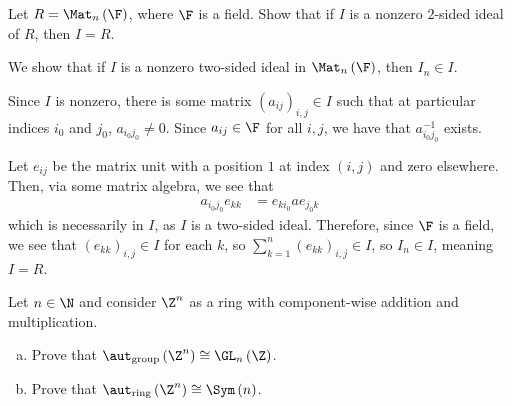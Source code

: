 \documentclass[10pt]{mypackage}
\begin{document}
\begin{problem}[Problem 7]
  Let $R = \Mat_{n}\left( \F \right)$, where $\F$ is a field. Show that if $I$ is a nonzero $2$-sided ideal of $R$, then $I = R$.
\end{problem}
\begin{solution}
  We show that if $I$ is a nonzero two-sided ideal in $\Mat_{n}\left( \F \right)$, then $I_{n}\in I$.\newline

  Since $I$ is nonzero, there is some matrix $\left( a_{ij} \right)_{i,j}\in I$ such that at particular indices $i_0$ and $j_0$, $a_{i_0j_0}\neq 0$. Since $a_{ij}\in \F$ for all $i,j$, we have that $a_{i_0j_0}^{-1}$ exists.\newline

  Let $e_{ij}$ be the matrix unit with a position $1$ at index $\left( i,j \right)$ and zero elsewhere. Then, via some matrix algebra, we see that
  \begin{align*}
    a_{i_0j_0} e_{kk} &= e_{ki_0}a e_{j_0 k}
  \end{align*}
  which is necessarily in $I$, as $I$ is a two-sided ideal. Therefore, since $\F$ is a field, we see that $\left( e_{kk} \right)_{i,j}\in I$ for each $k$, so $\sum_{k=1}^{n}\left( e_{kk} \right)_{i,j}\in I$, so $I_{n}\in I$, meaning $I = R$.
\end{solution}
\begin{problem}[Problem 8]
  Let $n\in\N$ and consider $\Z^{n}$ as a ring with component-wise addition and multiplication.
  \begin{enumerate}[(a)]
    \item Prove that $\aut_{\text{group}}\left( \Z^{n} \right) \cong \GL_{n}\left( \Z \right)$.
    \item Prove that $\aut_{\text{ring}} \left( \Z^{n} \right) \cong \Sym\left( n \right)$.
  \end{enumerate}
\end{problem}
\end{document}
